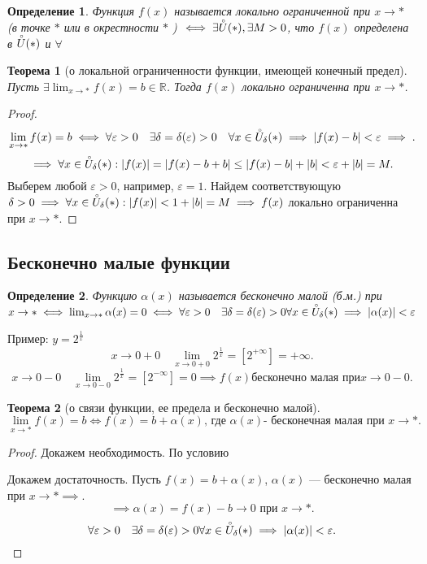 \documentclass[a4paper,12pt]{article} %
\newtheorem{definition}{Определение}[subsection]
\newtheorem{theorem}{Теорема}[subsection]
\theoremstyle{remark}
\begin{document}
\begin{definition}
	Функция $f(x)$ называется локально ограниченной при  $x \to *$ (в точке $*$ или в окрестности $*$ ) $\iff \exists \accentset{\circ}{U}(*), \exists M>0$, что $f(x)$ определена в  $\accentset{\circ}{U}(*) $ и $\forall $
\end{definition}

\begin{theorem}[о локальной ограниченности функции, имеющей конечный предел]
	Пусть $\exists \lim_{x \to *} f(x) = b \in \mathbb{R}$. Тогда $f(x)$ локально ограниченна при $x\to *$.
\end{theorem}
\begin{proof}
	\[
	\lim_{x \to *} f(x)=b \iff \forall \varepsilon> 0 \quad \exists \delta=\delta(\varepsilon)>0 \quad \forall x\in \accentset{\circ}{U}_\delta(*) \implies |f(x) - b| < \varepsilon \implies
	.\] 
	\[
	\implies \forall x\in \accentset{\circ}{U}_\delta(*) : |f(x)| = |f(x) -b + b| \le  |f(x) -b| + |b| < \varepsilon + |b| = M
	.\] 
	Выберем любой $\varepsilon>0$, например, $\varepsilon=1$. Найдем соответствующую $\delta>0 \implies \forall x\in \accentset{\circ}{U}_\delta(*) : |f(x)| < 1 + |b| = M \implies f(x) $ локально ограниченна при $x \to *$.
\end{proof}

\subsection{Бесконечно малые функции}
\begin{definition}
	Функцию $\alpha(x)$ называется бесконечно малой (б.м.) при $x \to  *\iff \lim_{x \to *} \alpha(x) = 0 \iff \forall  \varepsilon>0 \quad \exists \delta=\delta(\varepsilon) > 0 \forall x \in  \accentset{\circ}{U}_\delta(*) \implies |\alpha(x)| < \varepsilon $
\end{definition}
Пример: $y = 2^{\frac{1}{x}}$
\[
	x\to 0+0 \quad \lim_{x \to 0+0} 2^{\frac{1}{x}} = [2^{+\infty}] = +\infty
.\]
\[
	x\to 0-0 \quad \lim_{x \to 0-0} 2^{\frac{1}{x}} = [2^{-\infty}] = 0 \implies f(x) \text{бесконечно малая при} x \to 0-0
.\]

\begin{theorem}[о связи функции, ее предела и бесконечно малой]
\[
\lim_{x \to *} f(x) = b \iff f(x) = b + \alpha(x) \text{, где }\alpha(x) \text{- бесконечная малая при }x\to *
.\] 	
\end{theorem}
\begin{proof}
	Докажем необходимость.
	По условию 

	Докажем достаточность. Пусть $f(x) = b + \alpha(x)$,  $\alpha(x)$ --- бесконечно малая при  $x \to  * \implies$.
	\[
		\implies \alpha(x) = f(x) - b \to  0 \text{ при } x\to *
	.\] 
	\[\forall  \varepsilon>0 \quad \exists \delta=\delta(\varepsilon) > 0 \forall x \in  \accentset{\circ}{U}_\delta(*) \implies |\alpha(x)| < \varepsilon 
	.\]
\end{proof}
\end{document}
